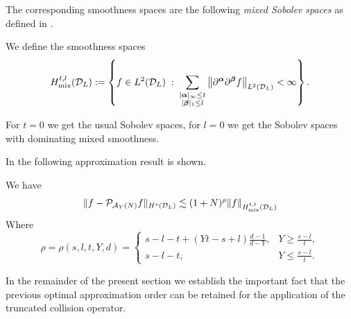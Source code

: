 The corresponding smoothness spaces are the following \emph{mixed Sobolev spaces}
as defined in \cite{Knapek00}.
\begin{definition}
    We define the smoothness spaces
    \begin{equation}
        {H}_{\mathrm{mix}}^{t,l}(\mathcal{D}_L):=
        \left\{
            f\in L^2(\mathcal{D}_L) \;:\; \sum_{\substack{|{\bm\alpha}|_\infty \le t\\
            |{\bm\beta}|_1 \le l}}\left\|\partial^{\bm\alpha} 
                    \partial^{\bm\beta} f\right\|_{L^2(\mathcal{D}_L)} <\infty
        \right\}.
    \end{equation}
\end{definition}
\begin{remark}
    For $t=0$ we get the usual Sobolev spaces, for $l=0$ we get the Sobolev
    spaces with dominating mixed smoothness.
\end{remark}
In \cite{Knapek00} the following approximation result is shown.
\begin{theorem}\label{thm:Knapek}
    We have
    \[
        \|f - \mathcal{P}_{\mathcal{A}_Y(N)}f\|_{H^s(\mathcal{D}_L)} \lesssim 
            (1+N)^{\rho} \|f\|_{{H}_{\mathrm{mix}}^{t,l}(\mathcal{D}_L)} 
    \]
    Where
    \begin{equation} \label{eq:hcrate}
        \rho = \rho(s,l,t,Y,d) = \begin{cases}
            s-l-t+(Yt-s+l)\frac{d-1}{d-Y},& Y\geq\frac{s-l}{t}, \\
            s-l-t,& Y\leq\frac{s-l}{t}. \end{cases}
    \end{equation}
\end{theorem}
In the remainder of the present section we establish the important fact that
the previous optimal approximation order can be retained for the application of
the truncated collision operator.

